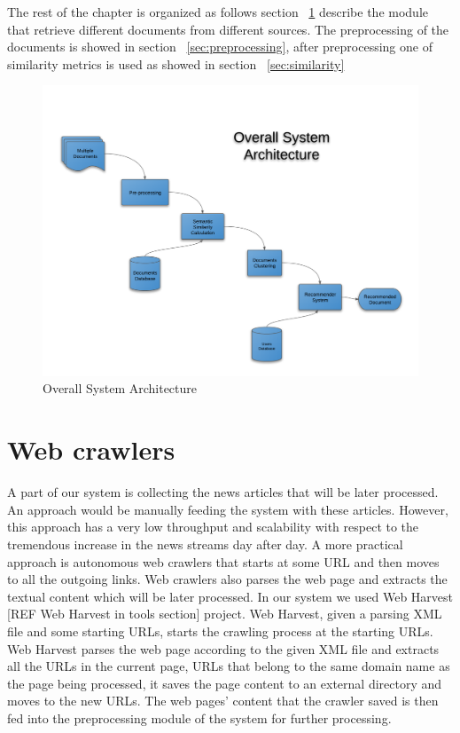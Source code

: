 The rest of the chapter is organized as follows section ~\ref{sec:crowlers} describe the module that retrieve different documents from different sources. The preprocessing of the documents is showed in section ~\ref{sec:preprocessing}, after preprocessing one of similarity metrics is used as showed in section ~\ref{sec:similarity}

\begin{figure}[htb]
\begin{center}
\includegraphics[totalheight=.5\textheight,
width=1\textwidth]{./Figures/arch_1.png}
\end{center}
\caption{Overall System Architecture}
\label{fig:arch_1}
\end{figure}

\section{Web crawlers}\label{sec:crowlers}
A part of our system is collecting the news articles that will be later processed. An approach would be manually feeding the system with these articles. However, this approach has a very low throughput and scalability with respect to the tremendous increase in the news streams day after day. A more practical approach is autonomous web crawlers that starts at some URL and then moves to all the outgoing links. Web crawlers also parses the web page and extracts the textual content which will be later processed. In our system we used Web Harvest [REF Web Harvest in tools section] project. Web Harvest, given a parsing XML file and some starting URLs, starts the crawling process at the starting URLs. Web Harvest parses the web page according to the given XML file and extracts all the URLs in the current page, URLs that belong to the same domain name as the page being processed, it saves the page content to an external directory and moves to the new URLs. The web pages’ content that the crawler saved is then fed into the preprocessing module of the system for further processing.
